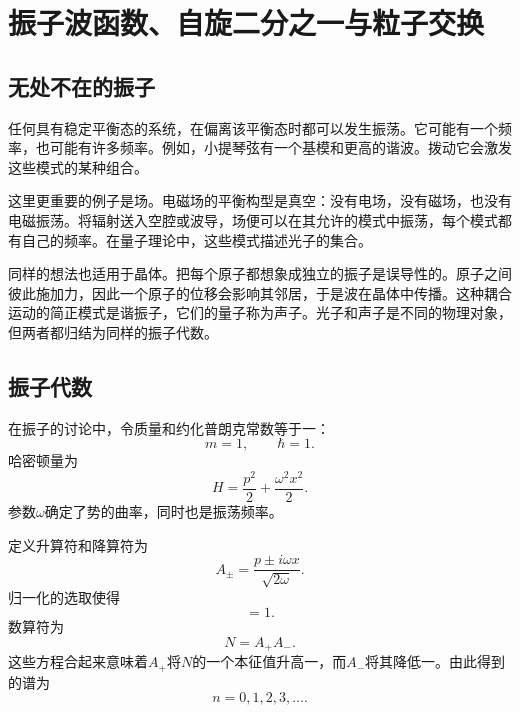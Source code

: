 \chapter{振子波函数、自旋二分之一与粒子交换}

\section{无处不在的振子}

任何具有稳定平衡态的系统，在偏离该平衡态时都可以发生振荡。它可能有一个频率，也可能有许多频率。例如，小提琴弦有一个基模和更高的谐波。拨动它会激发这些模式的某种组合。

这里更重要的例子是场。电磁场的平衡构型是真空：没有电场，没有磁场，也没有电磁振荡。将辐射送入空腔或波导，场便可以在其允许的模式中振荡，每个模式都有自己的频率。在量子理论中，这些模式描述光子的集合。

同样的想法也适用于晶体。把每个原子都想象成独立的振子是误导性的。原子之间彼此施加力，因此一个原子的位移会影响其邻居，于是波在晶体中传播。这种耦合运动的简正模式是谐振子，它们的量子称为声子。光子和声子是不同的物理对象，但两者都归结为同样的振子代数。

\section{振子代数}

在振子的讨论中，令质量和约化普朗克常数等于一：
\[
m=1,\qquad \hbar=1.
\]
哈密顿量为
\begin{equation}
H=\frac{p^{2}}{2}+\frac{\omega^{2}x^{2}}{2}.
\end{equation}
参数\(\omega\)确定了势的曲率，同时也是振荡频率。

定义升算符和降算符为
\begin{equation}
A_{\pm}=\frac{p\pm i\omega x}{\sqrt{2\omega}}.
\end{equation}
归一化的选取使得
\begin{equation}
[A_{-},A_{+}]=1.
\end{equation}
数算符为
\begin{equation}
N=A_{+}A_{-}.
\end{equation}
这些方程合起来意味着\(A_{+}\)将\(N\)的一个本征值升高一，而\(A_{-}\)将其降低一。由此得到的谱为
\begin{equation}
n=0,1,2,3,\ldots .
\end{equation}

